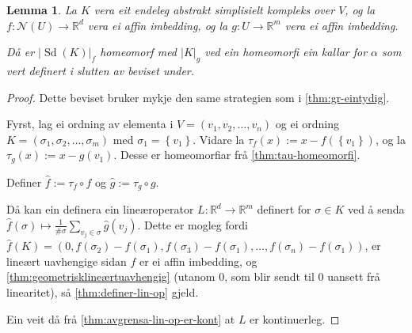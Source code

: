 \documentclass[a4paper, 12pt, norsk]{article}
\theoremstyle{plain}
\newtheorem{lemma}[theorem]{Lemma}
\theoremstyle{definition}
\newcommand{\Rb}{\mathbb{R}}
\newcommand{\Nc}{\mathcal{N}}
\newcommand{\gr}[1]{ \lvert #1 \rvert } %
\newcommand{\set}[1]{ \left\{ #1 \right\} } %
\DeclareMathOperator{\Sd}{Sd} %
\begin{document}
\begin{lemma} \label{thm:alpha-homeomorfi}
	La \( K \) vera eit endeleg abstrakt simplisielt kompleks over \( V \), og la \( f: \Nc(U) \to \Rb^d \) vera ei affin imbedding, og la \( g: U \to \Rb^m \) vera ei affin imbedding.
	
	Då er \( \gr{\Sd(K)}_f  \) homeomorf med \( \gr{K}_g \) ved ein homeomorfi ein kallar for \( \alpha \) som vert definert i slutten av beviset under.
\end{lemma}

\begin{proof}
	Dette beviset bruker mykje den same strategien som i \autoref{thm:gr-eintydig}.

	Fyrst, lag ei ordning av elementa i \( V = (v_1, v_2, \dots, v_n) \) og ei ordning \( K = (\sigma_1, \sigma_2, \dots, \sigma_m) \) med \( \sigma_1 = \set{v_1} \). Vidare la \( \tau_f(x) := x-f(\set{v_1}) \), og la \( \tau_g(x) := x-g(v_1) \). Desse er homeomorfiar frå \autoref{thm:tau-homeomorfi}.

	Definer \( \hat{f} := \tau_f \circ f \) og \( \hat{g} := \tau_g \circ g \).

	Då kan ein definera ein lineæroperator \( L: \Rb^d \to \Rb^m \) definert for \( \sigma \in K \) ved å senda \( \hat{f}(\sigma) \mapsto \frac{1}{\#\sigma}\sum_{v_j \in \sigma} \hat{g}(v_j) \). Dette er mogleg fordi \( \hat{f}(K) = (0, f(\sigma_2)-f(\sigma_1), f(\sigma_3)-f(\sigma_1), \dots, f(\sigma_n)-f(\sigma_1) ) \), er lineært uavhengige sidan \( f \) er ei affin imbedding, og \autoref{thm:geometrisklineærtuavhengig} (utanom \( 0 \), som blir sendt til \( 0 \) uansett frå linearitet), så \autoref{thm:definer-lin-op} gjeld.

	Ein veit då frå \autoref{thm:avgrensa-lin-op-er-kont} at \( L \) er kontinuerleg. 


\end{proof}
\end{document}

